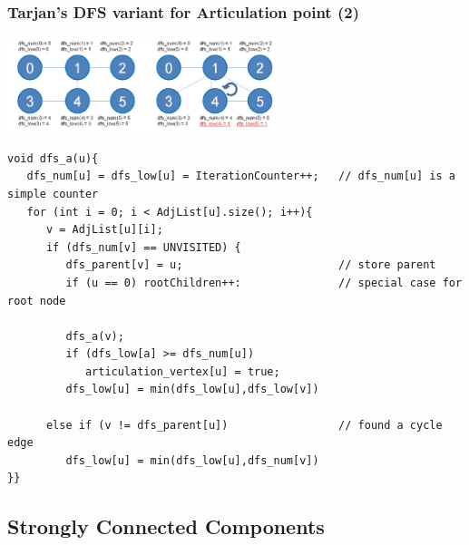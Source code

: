 \documentclass{beamer}
\begin{document}
\begin{frame}[fragile]
  \frametitle{Tarjan's DFS variant for Articulation point (2)}
  \begin{center}
    \includegraphics[width=0.6\textwidth]{../img/graph_articulation}
  \end{center}
  
{\tiny
  \begin{exampleblock}{}
\begin{verbatim}
void dfs_a(u){
   dfs_num[u] = dfs_low[u] = IterationCounter++;   // dfs_num[u] is a simple counter
   for (int i = 0; i < AdjList[u].size(); i++){
      v = AdjList[u][i];
      if (dfs_num[v] == UNVISITED) {
         dfs_parent[v] = u;                        // store parent
         if (u == 0) rootChildren++:               // special case for root node

         dfs_a(v);
         if (dfs_low[a] >= dfs_num[u])
            articulation_vertex[u] = true;
         dfs_low[u] = min(dfs_low[u],dfs_low[v])

      else if (v != dfs_parent[u])                 // found a cycle edge
         dfs_low[u] = min(dfs_low[u],dfs_num[v])
}}
\end{verbatim}
  \end{exampleblock}}
\end{frame}

\subsection{Strongly Connected Components}
\end{document}
